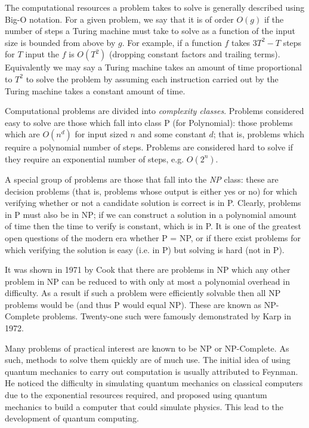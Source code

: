 The computational resources a problem takes to solve is generally described using Big-O notation.\cite{qcbook}  For a given problem, we say that it is of order $O(g)$ if the number of steps a Turing machine must take to solve as a function of the input size is bounded from above by $g$.  For example, if a function $f$ takes $3T^2 - T$ steps for $T$ input the $f$ is $O(T^2)$ (dropping constant factors and trailing terms).  Equivalently we may say a Turing machine takes an amount of time proportional to $T^2$ to solve the problem by assuming each instruction carried out by the Turing machine takes a constant amount of time.

Computational problems are divided into \emph{complexity classes}.  Problems considered easy to solve are those which fall into class P (for Polynomial): those problems which are $O(n^d)$ for input sized $n$ and some constant $d$; that is, problems which require a polynomial number of steps.  Problems are considered hard to solve if they require an exponential number of steps, e.g. $O(2^n)$.

A special group of problems are those that fall into the \emph{NP} class: these are decision problems (that is, problems whose output is either yes or no) for which verifying whether or not a candidate solution is correct is in P.  Clearly, problems in P must also be in NP; if we can construct a solution in a polynomial amount of time then the time to verify is constant, which is in P.  It is one of the greatest open questions of the modern era whether P = NP, or if there exist problems for which verifying the solution is easy (i.e. in P) but solving is hard (not in P).

It was shown in 1971 by Cook\cite{sat} that there are problems in NP which any other problem in NP can be reduced to with only at most a polynomial overhead in difficulty.  As a result if such a problem were efficiently solvable then all NP problems would be (and thus P would equal NP).  These are known as NP-Complete problems.  Twenty-one such were famously demonstrated by Karp in 1972.\cite{karp}

Many problems of practical interest are known to be NP or NP-Complete.  As such, methods to solve them quickly are of much use.  The initial idea of using quantum mechanics to carry out computation is usually attributed to Feynman.\cite{feynman}  He noticed the difficulty in simulating quantum mechanics on classical computers due to the exponential resources required, and proposed using quantum mechanics to build a computer that could simulate physics.  This lead to the development of quantum computing.

